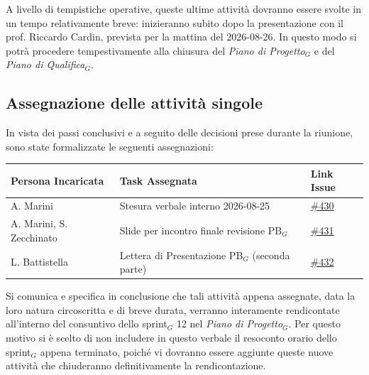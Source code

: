 \documentclass[a4paper, 10pt, colorlinks=true, linkcolor=black, urlcolor=blue, citecolor=blue, hidelinks]{article}
\newcommand{\issue}[1]{\href{https://github.com/thebitless-group-swe/thebitless.github.io/issues/#1}{\##1}}
\begin{document}
\noindent A livello di tempistiche operative, queste ultime attività dovranno essere svolte in un tempo relativamente breve: inizieranno subito dopo la presentazione con il prof. Riccardo Cardin, prevista per la mattina del 2026-08-26. In questo modo si potrà procedere tempestivamente alla chiusura del \textit{Piano di Progetto}$_G$ e del \textit{Piano di Qualifica}$_G$. 

\subsection{Assegnazione delle attività singole}
\label{sec:assegnazione-attivita}
In vista dei passi conclusivi e a seguito delle decisioni prese durante la riunione, sono state formalizzate le seguenti assegnazioni:

\begin{center}
    \renewcommand{\arraystretch}{1.4}
    \begin{tabular}{|p{4.2cm}|p{6.2cm}|p{2.2cm}|}
        \hline
        \textbf{Persona Incaricata} & \textbf{Task Assegnata} & \centering\textbf{Link Issue} \tabularnewline
        \hline
        A. Marini & Stesura verbale interno 2026-08-25 & \centering\issue{430} \tabularnewline
        \hline
        A. Marini, S. Zecchinato & Slide per incontro finale revisione PB$_G$ & \centering\issue{431} \tabularnewline
        \hline
        L. Battistella & Lettera di Presentazione PB$_G$ (seconda parte) & \centering\issue{432} \tabularnewline
        \hline
    \end{tabular}
\end{center}

\vspace{0.2cm}
\noindent Si comunica e specifica in conclusione che tali attività appena assegnate, data la loro natura circoscritta e di breve durata, verranno interamente rendicontate all'interno del consuntivo dello sprint$_G$ 12 nel \textit{Piano di Progetto}$_G$. Per questo motivo si è scelto di non includere in questo verbale il resoconto orario dello sprint$_G$ appena terminato, poiché vi dovranno essere aggiunte queste nuove attività che chiuderanno definitivamente la rendicontazione.

\appendix
\end{document}
